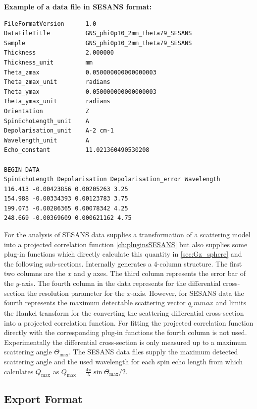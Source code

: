 \noindent
{\bf Example of a data file in SESANS format:}\\
{\tiny
\begin{verbatim}
FileFormatVersion      1.0
DataFileTitle          GNS_phi0p10_2mm_theta79_SESANS
Sample                 GNS_phi0p10_2mm_theta79_SESANS
Thickness              2.000000
Thickness_unit         mm
Theta_zmax             0.050000000000000003
Theta_zmax_unit        radians
Theta_ymax             0.050000000000000003
Theta_ymax_unit        radians
Orientation            Z
SpinEchoLength_unit    A
Depolarisation_unit    A-2 cm-1
Wavelength_unit        A
Echo_constant          11.021360490530208

BEGIN_DATA
SpinEchoLength Depolarisation Depolarisation_error Wavelength
116.413 -0.00423856 0.00205263 3.25
154.988 -0.00334393 0.00123783 3.75
199.073 -0.00286365 0.00078342 4.25
248.669 -0.00369609 0.000621162 4.75
\end{verbatim}

For the analysis of SESANS data \SASfit \cite{Kohlbrecher2017} supplies a transformation of a scattering model into a projected correlation function \ref{ch:pluginsSESANS} but also supplies some plug-in functions which directly calculate this quantity in \ref{sec:Gz_sphere} and the following sub-sections. Internally \SASfit generates a 4-column structure. The first two columns are the $x$ and $y$ axes. The third column represents the error bar of the $y$-axis. The fourth column in the \SASfit data represents for the differential cross-section the resolution parameter for the $x$-axis. However, for SESANS data the fourth represents the maximum detectable scattering vector $q_rm{max}$ and limits the Hankel transform for the converting the scattering differential cross-section into a projected correlation function. For fitting the projected correlation function directly with the corresponding plug-in functions the fourth column is not used. 
Experimentally the differential cross-section is only measured up to a maximum scattering angle $\Theta_\mathrm{max}$. The SESANS data files supply the maximum detected scattering angle and the used wavelength for each spin echo length from which \SASfit calculates $Q_\mathrm{max}$ as $Q_\mathrm{max}=\frac{4\pi}{\lambda}\sin \Theta_\mathrm{max}/2$.

\subsection{Export Format} \hspace{1pt}\\

}
